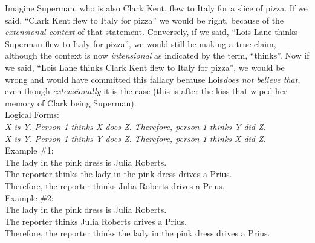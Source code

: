 \documentclass[a4paper,12pt,single,pdftex]{scrartcl}
\begin{document}
    
      Imagine Superman, who is also Clark Kent, flew to Italy for a slice of pizza.  If we said, “Clark Kent flew to Italy for pizza” we would be right, because of the {\it extensional context} of that statement.  Conversely, if we said, “Lois Lane thinks Superman flew to Italy for pizza”, we would still be making a true claim, although the context is now {\it intensional} as indicated by the term, “thinks”.  Now if we said, “Lois Lane thinks Clark Kent flew to Italy for pizza”, we would be wrong and would have committed this fallacy because Lois{\it  does not believe that}, even though {\it extensionally} it is the case (this is after the kiss that wiped her memory of Clark being Superman).
    \\

    
      Logical Forms:
    \\

    
      {\em X is Y.} \newline
{\em Person 1 thinks X does Z.} \newline
{\em Therefore, person 1 thinks Y did Z.}
    \\

    
      {\em X is Y.} \newline
{\em Person 1 thinks Y does Z.} \newline
{\em Therefore, person 1 thinks X did Z.}
    \\

    
      Example \#1:
    \\

    
      The lady in the pink dress is Julia Roberts.
    \\

    
      The reporter thinks the lady in the pink dress drives a Prius.
    \\

    
      Therefore, the reporter thinks Julia Roberts drives a Prius.
    \\

    
      Example \#2:
    \\

    
      The lady in the pink dress is Julia Roberts.
    \\

    
      The reporter thinks Julia Roberts drives a Prius.
    \\

    
      Therefore, the reporter thinks the lady in the pink dress drives a Prius.
    \\
\end{document}

